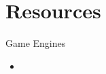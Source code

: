 \part{Resources}
\frame{\partpage}

\begin{frame}{Game Engines}
	\begin{itemize}
		\item
	\end{itemize}
\end{frame}
